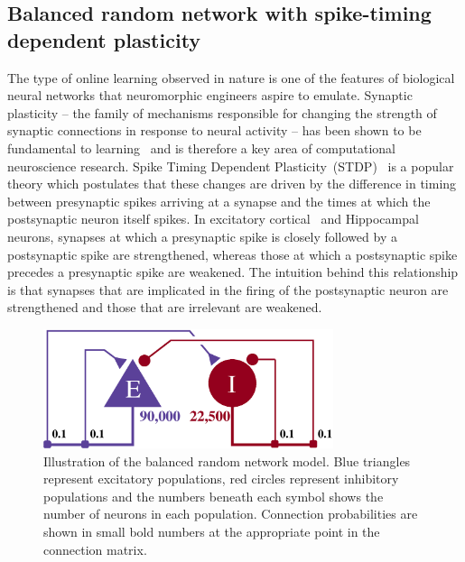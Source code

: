 \documentclass[utf8]{frontiersSCNS} %
\begin{document}
\subsection{Balanced random network with spike-timing dependent plasticity}
\label{sec:method/balanced_random}
The type of  online learning observed in nature is one of the features of biological neural networks that neuromorphic engineers aspire to emulate.
Synaptic plasticity -- the family of mechanisms responsible for changing the strength of synaptic connections in response to neural activity -- has been shown to be fundamental to learning~\citep{Nabavi2014} and is therefore a key area of computational neuroscience research.
Spike Timing Dependent Plasticity~(STDP)~\citep{Markram1997,Bi1998} is a popular theory which postulates that these changes are driven by the difference in timing between presynaptic spikes arriving at a synapse and the times at which the postsynaptic neuron itself spikes.
In excitatory cortical~\citep{Markram1997} and Hippocampal~\citep{Bi1998} neurons, synapses at which a presynaptic spike is closely followed by a postsynaptic spike are strengthened, whereas those at which a postsynaptic spike precedes a presynaptic spike are weakened.
The intuition behind this relationship is that synapses that are implicated in the firing of the postsynaptic neuron are strengthened and those that are irrelevant are weakened.

\begin{figure}
    \begin{center}
        \includegraphics[width=85mm]{figures/circuit2}
    \end{center}
    \caption{Illustration of the balanced random network model.
    Blue triangles represent excitatory populations, red circles represent inhibitory populations and the numbers beneath each symbol shows the number of neurons in each population.
    Connection probabilities are shown in small bold numbers at the appropriate point in the connection matrix.}
    \label{fig:balanced_random_circuit}
\end{figure}
\end{document}
